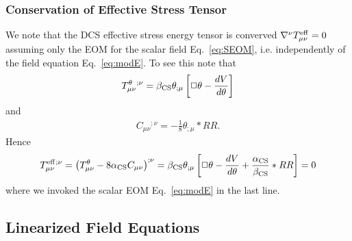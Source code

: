 \documentclass[aps,prd,amsmath,showpacs,amssymb,superscriptaddress,nofootinbib,longbibliography,eqsecnum,preprintnumbers]{revtex4-1}
\newcommand{\zach}[1]{\textcolor{ForestGreen}{#1}}
\newcommand{\acs}{\alpha_{\rm CS}}
\newcommand{\bcs}{\beta_{\rm CS}}
\begin{document}
\subsubsection{Conservation of Effective Stress Tensor}
We note that the DCS effective stress energy tensor is converved $\nabla^\nu T^{\rm eff}_{\mu\nu}=0$ assuming only the EOM for the scalar field Eq.~\eqref{eq:SEOM}, i.e. independently of the field equation  Eq.~\eqref{eq:modE}. 
To see this note that
\begin{align}
T_{\mu\nu}^\theta{}^{;\nu} = \bcs\theta_{;\mu}\left[\Box \theta -\frac{dV}{d\theta}\right]
\end{align}
and
\begin{align}
C_{\mu\nu}{}^{;\nu}=-\frac{1}{8}\theta_{;\mu}*RR.
\end{align}
Hence
\begin{align}
T^{\rm eff}_{\mu \nu}{}^{;\nu}=\left(T^{\theta}_{\mu\nu}-8\acs C_{\mu\nu}\right)^{;\nu} =\bcs \theta_{;\mu}\left[\Box \theta -\frac{dV}{d\theta}+\frac{\acs}{\bcs}*RR\right]=0
\end{align}
where we invoked the scalar EOM  Eq.~\eqref{eq:modE} in the last line.

\subsection{Linearized Field Equations}
\end{document}
